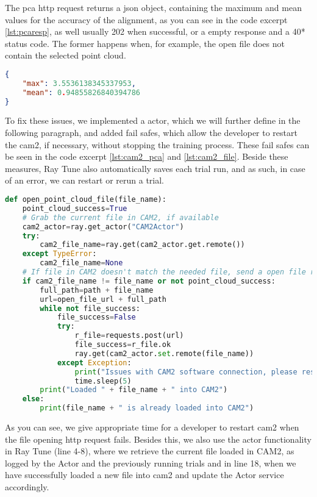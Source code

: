 The \acrshort{pca} \acrshort{http} request returns a \acrshort{json} object, containing the maximum and mean values for the accuracy of the alignment, as you can see in the code excerpt \ref{lst:pcaresp}, as well  usually 202 when successful, or a empty response and a 40* status code. The former happens when, for example, the open file does not contain the selected point cloud.

\begin{lstlisting}[language=json, caption=Example \acrshort{pca} \acrshort{http} request response, captionpos=b, label={lst:pcaresp}]
{
    "max": 3.5536138345337953,
    "mean": 0.94855826840394786
}
\end{lstlisting}

To fix these issues, we implemented a actor, which we will further define in the following paragraph, and added fail safes, which allow the developer to restart the \acrshort{cam2}, if necessary, without stopping the training process. These fail safes can be seen in the code excerpt \ref{lst:cam2_pca} and \ref{lst:cam2_file}. Beside these measures, Ray Tune also automatically saves each trial run, and as such, in case of an error, we can restart or rerun a trial.

\begin{lstlisting}[language=Python, caption=Opening a \acrshort{fcd} file in \acrshort{cam2}, captionpos=b, label={lst:cam2_pca}]
def open_point_cloud_file(file_name):
    point_cloud_success=True
    # Grab the current file in CAM2, if available
    cam2_actor=ray.get_actor("CAM2Actor")
    try:
        cam2_file_name=ray.get(cam2_actor.get.remote())
    except TypeError:
        cam2_file_name=None
    # If file in CAM2 doesn't match the needed file, send a open file request
    if cam2_file_name != file_name or not point_cloud_success:
        full_path=path + file_name
        url=open_file_url + full_path
        while not file_success:
            file_success=False
            try:
                r_file=requests.post(url)
                file_success=r_file.ok
                ray.get(cam2_actor.set.remote(file_name))
            except Exception:
                print("Issues with CAM2 software connection, please restart the CAM2 software.")
                time.sleep(5)
        print("Loaded " + file_name + " into CAM2")
    else:
        print(file_name + " is already loaded into CAM2")
\end{lstlisting}

As you can see, we give appropriate time for a developer to restart \acrshort{cam2} when the file opening \acrshort{http} request fails. Besides this, we also use the actor functionality in Ray Tune (line 4-8), where we retrieve the current file loaded in CAM2, as logged by the Actor and the previously running trials and in line 18, when we have successfully loaded a new file into \acrshort{cam2} and update the Actor service accordingly.


